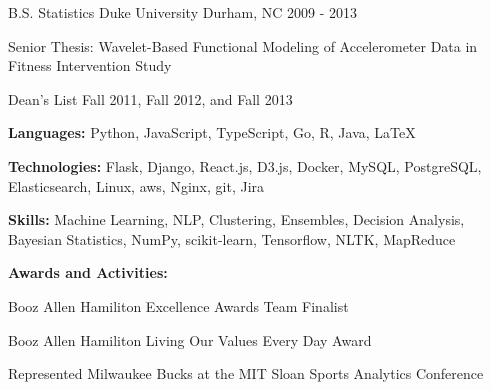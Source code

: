 \documentclass[11pt, a4paper]{awesome-cv}
\begin{document}
\makecvheader

\begin{cventries}
  \vspace{.5 mm}
  \cventry
    {B.S. Statistics}
    {Duke University}
    {Durham, NC}
    {2009 - 2013}
    {
      \begin{cvitems}
        \item{Senior Thesis: Wavelet-Based Functional Modeling of Accelerometer Data
        in Fitness Intervention Study}
        \item{Dean’s List Fall 2011, Fall 2012, and Fall 2013}
      \end{cvitems}
    }
\end{cventries}

\begin{cventries}
  \cventry
    {}
    {}
    {}
    {}
    {
      \begin{cvitems}
        \item{\textbf{Languages:} Python, JavaScript, TypeScript, Go, R, Java, \LaTeX}
        \item{\textbf{Technologies:} Flask, Django, React.js, D3.js, Docker, MySQL, PostgreSQL, Elasticsearch, Linux, aws, Nginx, git, Jira}
        \item{\textbf{Skills:} Machine Learning, NLP, Clustering, Ensembles, Decision Analysis, Bayesian Statistics, NumPy, scikit-learn, Tensorflow, NLTK, MapReduce}
        \item{
          \textbf{Awards and Activities:}
          \\
          \vspace{0.05in}
          \begin{cvitems}
            \item{Booz Allen Hamiliton Excellence Awards Team Finalist}
            \item{Booz Allen Hamiliton Living Our Values Every Day Award}
            \item{Represented Milwaukee Bucks at the MIT Sloan Sports Analytics Conference}
          \end{cvitems}
        }
      \end{cvitems}
    }
\end{cventries}
\end{document}
